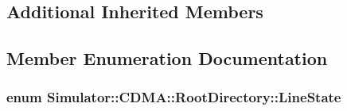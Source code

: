 \subsection*{Additional Inherited Members}


\subsection{Member Enumeration Documentation}
\hypertarget{class_simulator_1_1_c_d_m_a_1_1_root_directory_a54079b84b63737f0a28b9a28dbd5f1ee}{
\subsubsection[{Line\+State}]{\setlength{\rightskip}{0pt plus 5cm}enum {\bf Simulator\+::\+C\+D\+M\+A\+::\+Root\+Directory\+::\+Line\+State}}}\label{class_simulator_1_1_c_d_m_a_1_1_root_directory_a54079b84b63737f0a28b9a28dbd5f1ee}
